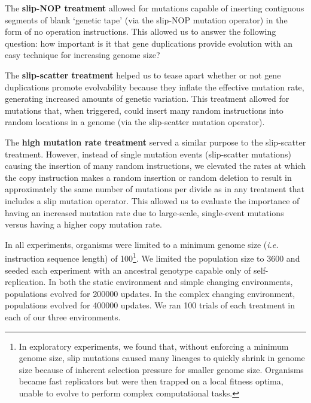 The \textbf{slip-NOP treatment} allowed for mutations capable of inserting contiguous segments of blank `genetic tape' (via the slip-NOP mutation operator) in the form of no operation instructions. This allowed us to answer the following question: how important is it that gene duplications provide evolution with an easy technique for increasing genome size?

The \textbf{slip-scatter treatment} helped us to tease apart whether or not gene duplications promote evolvability because they inflate the effective mutation rate, generating increased amounts of genetic variation. This treatment allowed for mutations that, when triggered, could insert many random instructions into random locations in a genome (via the slip-scatter mutation operator).

The \textbf{high mutation rate treatment} served a similar purpose to the slip-scatter treatment. However, instead of single mutation events (slip-scatter mutations) causing the insertion of many random instructions, we elevated the rates at which the copy instruction makes a random insertion or random deletion to result in approximately the same number of mutations per divide as in any treatment that includes a slip mutation operator. This allowed us to evaluate the importance of having an increased mutation rate due to large-scale, single-event mutations versus having a higher copy mutation rate.

In all experiments, organisms were limited to a minimum genome size (\textit{i.e.} instruction sequence length) of 100\footnote{
In exploratory experiments, we found that, without enforcing a minimum genome size, slip mutations caused many lineages to quickly shrink in genome size because of inherent selection pressure for smaller genome size. Organisms became fast replicators but were then trapped on a local fitness optima, unable to evolve to perform complex computational tasks.
}.
We limited the population size to 3600 and seeded each experiment with an ancestral genotype capable only of self-replication. In both the static environment and simple changing environments, populations evolved for 200000 updates. In the complex changing environment, populations evolved for 400000 updates. We ran 100 trials of each treatment in each of our three environments.

